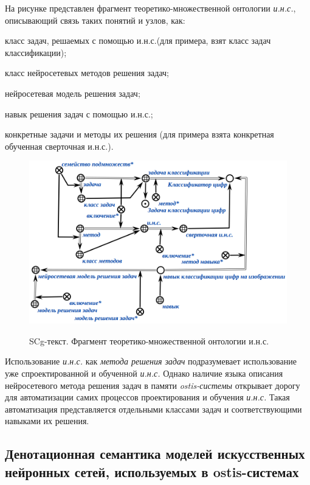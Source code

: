 На рисунке \textit{} представлен фрагмент теоретико-множественной онтологии \textit{и.н.с.}, описывающий связь таких понятий и узлов, как:
\begin{textitemize}
	\item класс задач, решаемых с помощью и.н.с.(для примера, взят класс задач классификации);
	\item класс нейросетевых методов решения задач;
	\item нейросетевая модель решения задач;
	\item навык решения задач с помощью и.н.с.;
	\item конкретные задачи и методы их решения (для примера взята конкретная обученная сверточная и.н.с.).
\end{textitemize}

\begin{figure}[H]
	\caption{SCg-текст. Фрагмент теоретико-множественной онтологии и.н.с.}
	\includegraphics[scale=0.5]{author/part3/figures/actions_concepts.png}
	\label{fig:actions_concepts}
\end{figure}

Использование \textit{и.н.с.} как\textit{ метода решения задач} подразумевает использование уже спроектированной и обученной \textit{и.н.с.} Однако наличие языка описания нейросетевого метода решения задач в памяти \textit{ostis-системы} открывает дорогу для автоматизации самих процессов проектирования и обучения \textit{и.н.с.} Такая автоматизация представляется отдельными классами задач и соответствующими навыками их решения.

\subsection{Денотационная семантика моделей искусственных нейронных сетей, используемых в ostis-системах}
\label{subsec_ann_denot}

